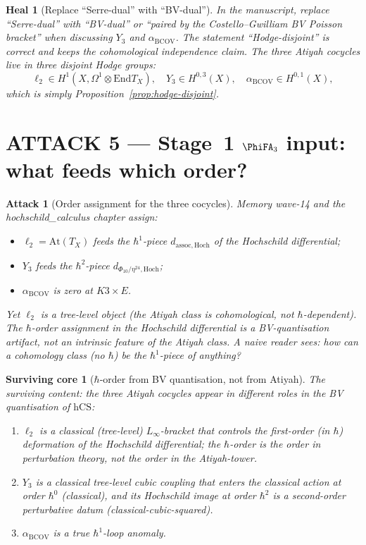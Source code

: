 \documentclass[11pt]{article}
\newtheorem{attack}[theorem]{Attack}
\newtheorem{heal}[theorem]{Heal}
\newtheorem{surviving}[theorem]{Surviving core}
\providecommand{\At}{\mathrm{At}}
\providecommand{\End}{\mathrm{End}}
\providecommand{\BCOV}{\mathrm{BCOV}}
\providecommand{\hCS}{\mathrm{hCS}}
\providecommand{\Om}{\Omega}
\begin{document}
\begin{heal}[Replace ``Serre-dual'' with ``BV-dual'']
\label{heal:4}
In the manuscript, replace ``Serre-dual'' with ``BV-dual'' or ``paired
by the Costello--Gwilliam BV Poisson bracket'' when discussing $Y_3$
and $\alpha_\BCOV$. The statement ``Hodge-disjoint'' is correct and
keeps the cohomological independence claim. The three Atiyah cocycles
live in three disjoint Hodge groups:
\[
  \ell_2 \in H^1(X, \Om^1 \otimes \End T_X), \quad
  Y_3 \in H^{0,3}(X), \quad
  \alpha_\BCOV \in H^{0,1}(X),
\]
which is simply Proposition~\ref{prop:hodge-disjoint}.
\end{heal}

\section{ATTACK 5 --- Stage~1 $\PhiFA_3$ input: what feeds which order?}
\label{sec:attack-5}

\begin{attack}[Order assignment for the three cocycles]
\label{atk:5}
Memory wave-14 and the hochschild\_calculus chapter assign:
\begin{itemize}
\item $\ell_2 = \At(T_X)$ feeds the $\hbar^1$-piece $d_{\mathrm{assoc,
Hoch}}$ of the Hochschild differential;
\item $Y_3$ feeds the $\hbar^2$-piece $d_{\Phi_{10}/\eta^{24},
\mathrm{Hoch}}$;
\item $\alpha_\BCOV$ is zero at $K3 \times E$.
\end{itemize}
Yet $\ell_2$ is a tree-level object (the Atiyah class is cohomological,
not $\hbar$-dependent). The $\hbar$-order assignment in the Hochschild
differential is a BV-quantisation artifact, not an intrinsic feature of
the Atiyah class. A naive reader sees: how can a cohomology class (no
$\hbar$) be the $\hbar^1$-piece of anything?
\end{attack}

\begin{surviving}[$\hbar$-order from BV quantisation, not from Atiyah]
\label{surv:5}
The surviving content: the three Atiyah cocycles appear in different
\emph{roles} in the BV quantisation of $\hCS$:
\begin{enumerate}
\item $\ell_2$ is a classical (tree-level) $L_\infty$-bracket that
controls the first-order (in $\hbar$) deformation of the Hochschild
differential; the $\hbar$-order is the order in perturbation theory, not
the order in the Atiyah-tower.
\item $Y_3$ is a classical tree-level cubic coupling that enters the
classical action at order $\hbar^0$ (classical), and its Hochschild
image at order $\hbar^2$ is a second-order perturbative datum
(classical-cubic-squared).
\item $\alpha_\BCOV$ is a true $\hbar^1$-loop anomaly.
\end{enumerate}
\end{surviving}
\end{document}

